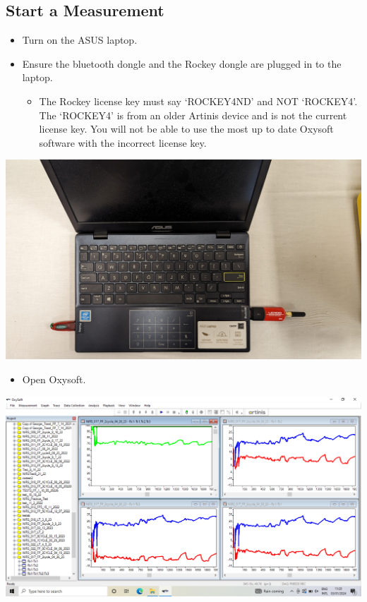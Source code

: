\documentclass[
]{book}
\providecommand{\tightlist}{%
  \setlength{\itemsep}{0pt}\setlength{\parskip}{0pt}}
\begin{document}
\hypertarget{PortaMon-StartMeasurement}{%
\subsection{Start a Measurement}\label{PortaMon-StartMeasurement}}

\begin{itemize}
\tightlist
\item
  Turn on the ASUS laptop.\\
\item
  Ensure the bluetooth dongle and the Rockey dongle are plugged in to the laptop.

  \begin{itemize}
  \tightlist
  \item
    The Rockey license key must say `ROCKEY4ND' and NOT `ROCKEY4'. The `ROCKEY4' is from an older Artinis device and is not the current license key. You will not be able to use the most up to date Oxysoft software with the incorrect license key.
  \end{itemize}
\end{itemize}

\includegraphics[width=1\linewidth]{images/portamon/laptopwithplugins}

\begin{itemize}
\tightlist
\item
  Open Oxysoft.
\end{itemize}

\includegraphics[width=1\linewidth]{images/startnewmeasurement/01_open_oxysoft}
\end{document}
